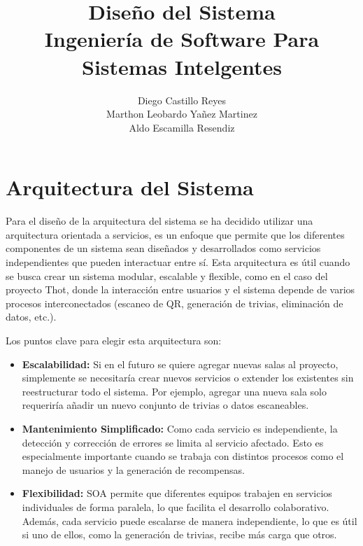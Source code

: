 \documentclass{report}
\title{\Huge{\textbf{Diseño del Sistema}}\\
\Large{\textbf{Ingeniería de Software Para Sistemas Intelgentes}}}
\author{Diego Castillo Reyes\\Marthon Leobardo Yañez Martinez\\Aldo Escamilla Resendiz}
\begin{document}
\maketitle
\newpage

\section{Arquitectura del Sistema}
Para el diseño de la arquitectura del sistema se ha decidido utilizar una arquitectura orientada a servicios, es un enfoque que 
permite que los diferentes componentes de un sistema sean diseñados y desarrollados como servicios independientes que pueden 
interactuar entre sí. Esta arquitectura es útil cuando se busca crear un sistema modular, escalable y flexible, como en el caso 
del proyecto Thot, donde la interacción entre usuarios y el sistema depende de varios procesos interconectados 
(escaneo de QR, generación de trivias, eliminación de datos, etc.).

Los puntos clave para elegir esta arquitectura son:
\begin{itemize}
    \item \textbf{Escalabilidad:} Si en el futuro se quiere agregar nuevas salas al proyecto, simplemente se necesitaría crear nuevos servicios o extender 
    los existentes sin reestructurar todo el sistema. Por ejemplo, agregar una nueva sala solo requeriría añadir un nuevo conjunto de trivias o datos escaneables.
    \item \textbf{Mantenimiento Simplificado:} Como cada servicio es independiente, la detección y corrección de errores se limita al servicio afectado. Esto es 
    especialmente importante cuando se trabaja con distintos procesos como el manejo de usuarios y la generación de recompensas.
    \item \textbf{Flexibilidad:} SOA permite que diferentes equipos trabajen en servicios individuales de forma paralela, lo que 
    facilita el desarrollo colaborativo. Además, cada servicio puede escalarse de manera independiente, lo que es útil 
    si uno de ellos, como la generación de trivias, recibe más carga que otros.
\end{itemize}
\end{document}

